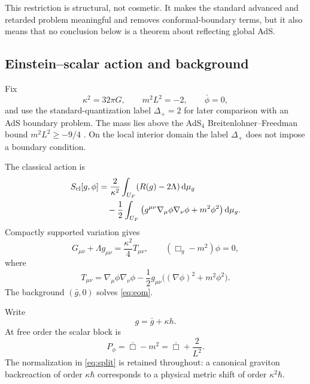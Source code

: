 \documentclass[11pt]{article}
\theoremstyle{definition}
\theoremstyle{remark}
\newcommand{\U}{U_{F}}
\newcommand{\gbar}{\bar g}
\newcommand{\dd}{\mathrm d}
\begin{document}
This restriction is structural, not cosmetic.  It makes the standard advanced and
retarded problem meaningful and removes conformal-boundary terms, but it also means
that no conclusion below is a theorem about reflecting global AdS.

\subsection{Einstein--scalar action and background}

Fix
\begin{equation}
 \kappa^2=32\pi G,
 \qquad m^2L^2=-2,
 \qquad \bar\phi=0,
 \label{eq:params}
\end{equation}
and use the standard-quantization label $\Delta_+=2$ for later comparison with an AdS
boundary problem.  The mass lies above the AdS$_4$ Breitenlohner--Freedman bound
$m^2L^2\geq-9/4$ \cite{BreitenlohnerFreedman1982}.  On the local interior domain the
label $\Delta_+$ does not impose a boundary condition.

The classical action is
\begin{align}
 S_{\mathrm{cl}}[g,\phi]
 &=\frac{2}{\kappa^2}\int_{\U}(R(g)-2\Lambda)\,\dd\mu_g \notag\\
 &\quad-\frac12\int_{\U}
 \left(g^{\mu\nu}\nabla_\mu\phi\nabla_\nu\phi+m^2\phi^2\right)\dd\mu_g.
 \label{eq:classicalaction}
\end{align}
Compactly supported variation gives
\begin{equation}
 G_{\mu\nu}+\Lambda g_{\mu\nu}=\frac{\kappa^2}{4}T_{\mu\nu},
 \qquad (\Box_g-m^2)\phi=0,
 \label{eq:eom}
\end{equation}
where
\begin{equation}
 T_{\mu\nu}=\nabla_\mu\phi\nabla_\nu\phi
 -\frac12g_{\mu\nu}\bigl((\nabla\phi)^2+m^2\phi^2\bigr).
\end{equation}
The background $(\gbar,0)$ solves \cref{eq:eom}.

Write
\begin{equation}
 g=\gbar+\kappa h.
 \label{eq:split}
\end{equation}
At free order the scalar block is
\begin{equation}
 P_\phi=\bar\Box-m^2=\bar\Box+\frac{2}{L^2}.
 \label{eq:scalarP}
\end{equation}
The normalization in \cref{eq:split} is retained throughout: a canonical graviton
backreaction of order $\kappa\hbar$ corresponds to a physical metric shift of order
$\kappa^2\hbar$.
\end{document}
